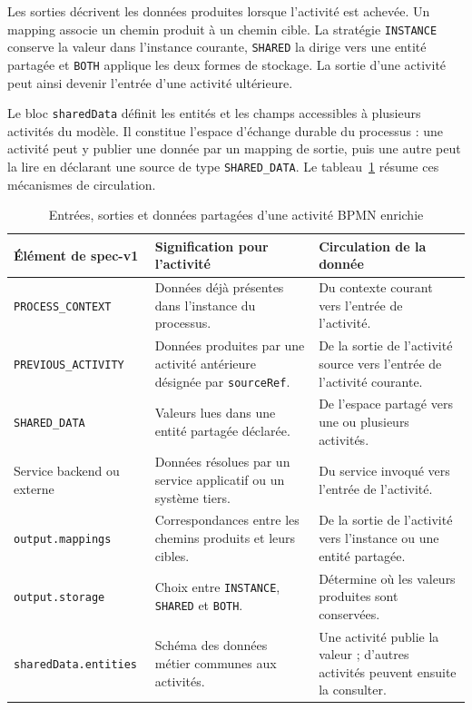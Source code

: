Les sorties décrivent les données produites lorsque l'activité est achevée. Un
mapping associe un chemin produit à un chemin cible. La stratégie
\texttt{INSTANCE} conserve la valeur dans l'instance courante,
\texttt{SHARED} la dirige vers une entité partagée et \texttt{BOTH} applique
les deux formes de stockage. La sortie d'une activité peut ainsi devenir
l'entrée d'une activité ultérieure.

Le bloc \texttt{sharedData} définit les entités et les champs accessibles à
plusieurs activités du modèle. Il constitue l'espace d'échange durable du
processus : une activité peut y publier une donnée par un mapping de sortie,
puis une autre peut la lire en déclarant une source de type
\texttt{SHARED\_DATA}. Le tableau~\ref{tab:chap3-correspondance-entree-generation}
résume ces mécanismes de circulation.

\begin{table}[H]
\centering
\small
\caption{Entrées, sorties et données partagées d'une activité BPMN enrichie}
\label{tab:chap3-correspondance-entree-generation}
\begin{tabularx}{\textwidth}{p{4.0cm}p{5.0cm}X}
\toprule
\textbf{Élément de spec-v1} & \textbf{Signification pour l'activité} & \textbf{Circulation de la donnée} \\
\midrule
\texttt{PROCESS\_CONTEXT} & Données déjà présentes dans l'instance du processus. & Du contexte courant vers l'entrée de l'activité. \\
\texttt{PREVIOUS\_ACTIVITY} & Données produites par une activité antérieure désignée par \texttt{sourceRef}. & De la sortie de l'activité source vers l'entrée de l'activité courante. \\
\texttt{SHARED\_DATA} & Valeurs lues dans une entité partagée déclarée. & De l'espace partagé vers une ou plusieurs activités. \\
Service backend ou externe & Données résolues par un service applicatif ou un système tiers. & Du service invoqué vers l'entrée de l'activité. \\
\texttt{output.mappings} & Correspondances entre les chemins produits et leurs cibles. & De la sortie de l'activité vers l'instance ou une entité partagée. \\
\texttt{output.storage} & Choix entre \texttt{INSTANCE}, \texttt{SHARED} et \texttt{BOTH}. & Détermine où les valeurs produites sont conservées. \\
\texttt{sharedData.entities} & Schéma des données métier communes aux activités. & Une activité publie la valeur ; d'autres activités peuvent ensuite la consulter. \\
\bottomrule
\end{tabularx}
\end{table}

